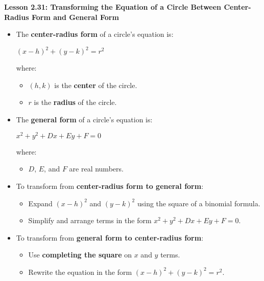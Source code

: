 \begin{center}
\textbf{Lesson 2.31: Transforming the Equation of a Circle Between Center-Radius Form and General Form}
\end{center}

\vspace*{-1.5ex}

\begin{itemize}
    \item The \textbf{center-radius form} of a circle's equation is:

{\centering $
    (x - h)^2 + (y - k)^2 = r^2
$\par}
    where:
    \begin{itemize}
        \item $(h, k)$ is the \textbf{center} of the circle.
        \item $r$ is the \textbf{radius} of the circle.
    \end{itemize}
    \item The \textbf{general form} of a circle's equation is:

{\centering $
    x^2 + y^2 + Dx + Ey + F = 0
$\par}
    where:
    \begin{itemize}
        \item $D$, $E$, and $F$ are real numbers.
    \end{itemize}
    \item To transform from \textbf{center-radius form to general form}:
    \begin{itemize}
        \item Expand $(x - h)^2$ and $(y - k)^2$ using the square of a binomial formula.
        \item Simplify and arrange terms in the form $x^2 + y^2 + Dx + Ey + F = 0$.
    \end{itemize}
    \item To transform from \textbf{general form to center-radius form}:
    \begin{itemize}
        \item Use \textbf{completing the square} on $x$ and $y$ terms.
        \item Rewrite the equation in the form $(x - h)^2 + (y - k)^2 = r^2$.
    \end{itemize}
\end{itemize}
